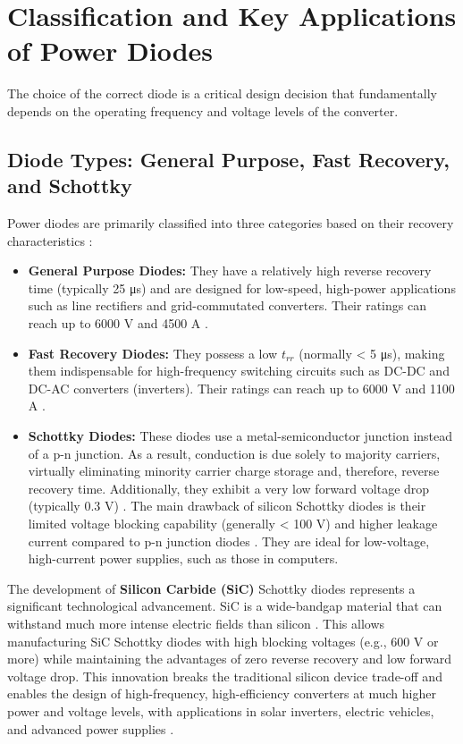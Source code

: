\documentclass[12pt,a4paper]{article}
\begin{document}
\section{Classification and Key Applications of Power Diodes}

The choice of the correct diode is a critical design decision that fundamentally depends on the operating frequency and voltage levels of the converter.

\subsection{Diode Types: General Purpose, Fast Recovery, and Schottky}

Power diodes are primarily classified into three categories based on their recovery characteristics \cite{rashid2014}:

\begin{itemize}
    \item \textbf{General Purpose Diodes:} They have a relatively high reverse recovery time (typically 25 μs) and are designed for low-speed, high-power applications such as line rectifiers and grid-commutated converters. Their ratings can reach up to 6000 V and 4500 A \cite{rashid2014}.
    
    \item \textbf{Fast Recovery Diodes:} They possess a low $t_{rr}$ (normally < 5 μs), making them indispensable for high-frequency switching circuits such as DC-DC and DC-AC converters (inverters). Their ratings can reach up to 6000 V and 1100 A \cite{rashid2014, mohan2003}.
    
    \item \textbf{Schottky Diodes:} These diodes use a metal-semiconductor junction instead of a p-n junction. As a result, conduction is due solely to majority carriers, virtually eliminating minority carrier charge storage and, therefore, reverse recovery time. Additionally, they exhibit a very low forward voltage drop (typically 0.3 V) \cite{rashid2014, mohan2003}. The main drawback of silicon Schottky diodes is their limited voltage blocking capability (generally < 100 V) and higher leakage current compared to p-n junction diodes \cite{rashid2014}. They are ideal for low-voltage, high-current power supplies, such as those in computers.
\end{itemize}

The development of \textbf{Silicon Carbide (SiC)} Schottky diodes represents a significant technological advancement. SiC is a wide-bandgap material that can withstand much more intense electric fields than silicon \cite{rashid2014, erickson2001}. This allows manufacturing SiC Schottky diodes with high blocking voltages (e.g., 600 V or more) while maintaining the advantages of zero reverse recovery and low forward voltage drop. This innovation breaks the traditional silicon device trade-off and enables the design of high-frequency, high-efficiency converters at much higher power and voltage levels, with applications in solar inverters, electric vehicles, and advanced power supplies \cite{rashid2014}.
\end{document}
